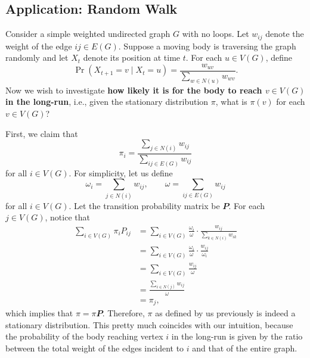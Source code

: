 \documentclass[math, code]{amznotes}
\theoremstyle{remark}
\begin{document}
\subsection{Application: Random Walk}
Consider a simple weighted undirected graph $G$ with no loops. Let $w_{ij}$ denote the weight of the edge $ij \in E\left(G\right)$. Suppose a moving body is traversing the graph randomly and let $X_t$ denote its position at time $t$. For each $u \in V\left(G\right)$, define 
\begin{equation*}
    \Pr\left(X_{t + 1} = v \mid X_t = u\right) = \frac{w_{uv}}{\sum_{w \in N\left(u\right)}w_{wv}}.
\end{equation*}
Now we wish to investigate \textbf{how likely it is for the body to reach $v \in V\left(G\right)$ in the long-run}, i.e., given the stationary distribution $\pi$, what is $\pi\left(v\right)$ for each $v \in V\left(G\right)$?

First, we claim that 
\begin{equation*}
    \pi_i = \frac{\sum_{j \in N\left(i\right)}w_{ij}}{\sum_{ij \in E\left(G\right)}w_{ij}}
\end{equation*}
for all $i \in V\left(G\right)$. For simplicity, let us define 
\begin{equation*}
    \omega_i = \sum_{j \in N\left(i\right)}w_{ij}, \qquad \omega = \sum_{ij \in E\left(G\right)}w_{ij}
\end{equation*}
for all $i \in V\left(G\right)$. Let the transition probability matrix be $\mathbfit{P}$. For each $j \in V\left(G\right)$, notice that 
\begin{align*}
    \sum_{i \in V\left(G\right)}\pi_iP_{ij} & = \sum_{i \in V\left(G\right)}\frac{\omega_i}{\omega} \cdot \frac{w_{ij}}{\sum_{k \in N\left(i\right)}w_{ik}} \\
    & = \sum_{i \in V\left(G\right)}\frac{\omega_i}{\omega} \cdot \frac{w_{ij}}{\omega_i} \\
    & = \sum_{i \in V\left(G\right)}\frac{w_{ij}}{\omega} \\
    & = \frac{\sum_{i \in N\left(j\right)}w_{ij}}{\omega} \\
    & = \pi_j,
\end{align*}
which implies that $\pi = \pi\mathbfit{P}$. Therefore, $\pi$ as defined by us previously is indeed a stationary distribution. This pretty much coincides with our intuition, because the probability of the body reaching vertex $i$ in the long-run is given by the ratio between the total weight of the edges incident to $i$ and that of the entire graph.
\end{document}
